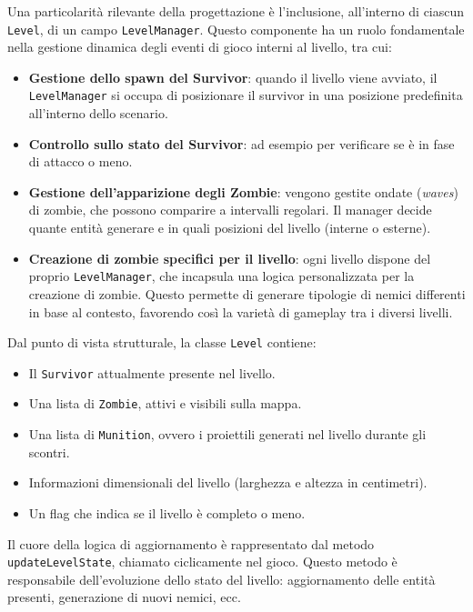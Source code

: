 \documentclass[a4paper,12pt]{report}
\begin{document}
\bigskip

Una particolarità rilevante della progettazione è l’inclusione, all’interno di ciascun \texttt{Level}, di un campo \texttt{LevelManager}. Questo componente ha un ruolo fondamentale nella gestione dinamica degli eventi di gioco interni al livello, tra cui:

\begin{itemize}
    \item \textbf{Gestione dello spawn del Survivor}: quando il livello viene avviato, il \texttt{LevelManager} si occupa di posizionare il survivor in una posizione predefinita all'interno dello scenario.
    
    \item \textbf{Controllo sullo stato del Survivor}: ad esempio per verificare se è in fase di attacco o meno.
    
    \item \textbf{Gestione dell'apparizione degli Zombie}: vengono gestite ondate (\textit{waves}) di zombie, che possono comparire a intervalli regolari. Il manager decide quante entità generare e in quali posizioni del livello (interne o esterne).
    
    \item \textbf{Creazione di zombie specifici per il livello}: ogni livello dispone del proprio \texttt{LevelManager}, che incapsula una logica personalizzata per la creazione di zombie. Questo permette di generare tipologie di nemici differenti in base al contesto, favorendo così la varietà di gameplay tra i diversi livelli.
\end{itemize}

\bigskip

Dal punto di vista strutturale, la classe \texttt{Level} contiene:

\begin{itemize}
    \item Il \texttt{Survivor} attualmente presente nel livello.
    \item Una lista di \texttt{Zombie}, attivi e visibili sulla mappa.
    \item Una lista di \texttt{Munition}, ovvero i proiettili generati nel livello durante gli scontri.
    \item Informazioni dimensionali del livello (larghezza e altezza in centimetri).
    \item Un flag che indica se il livello è completo o meno.
\end{itemize}

Il cuore della logica di aggiornamento è rappresentato dal metodo \texttt{updateLevelState}, chiamato ciclicamente nel gioco. Questo metodo è responsabile dell’evoluzione dello stato del livello: aggiornamento delle entità presenti, generazione di nuovi nemici, ecc.
\end{document}
